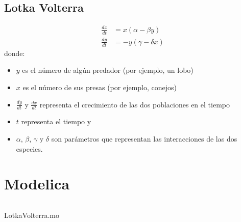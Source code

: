\documentclass{beamer}
\begin{document}
\subsection{Lotka Volterra}
\begin{frame}
	\begin{align*}
		\frac{dx}{dt} &= x(\alpha - \beta y) \\
		\frac{dy}{dt} &= - y(\gamma - \delta  x)
	\end{align*}
	donde:
	\begin{itemize}
		\item $y$ es el número de algún predador (por ejemplo, un lobo)
		\item $x$ es el número de sus presas (por ejemplo, conejos)
		\item $\frac{dy}{dt}$ y $\frac{dx}{dt}$ representa el crecimiento de las dos poblaciones en el tiempo
		\item $t$ representa el tiempo y
		\item $\alpha$, $\beta$, $\gamma$ y $\delta$ son parámetros que representan las interacciones de las dos especies.
	\end{itemize}
\end{frame}



\section{Modelica}
\begin{frame}[fragile]
\centering
\begin{listing}[H]    
	\inputminted[linenos]{modelica}{src/LotkaVolterra.mo}
	\caption{LotkaVolterra.mo}\label{lst:LotkaVolterra.mo}
\end{listing}
\end{frame}
\end{document}
